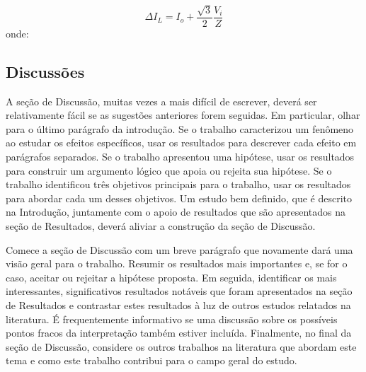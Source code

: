 \begin{equation}\label{eq:eq01}
\Delta I_{L}=I_{o}+\frac{\sqrt{3}}{2}\frac{V_{i}}{Z}
\end{equation} 
onde: 



\subsection{Discussões}
A seção de Discussão, muitas vezes a mais difícil de escrever, deverá ser relativamente fácil se as sugestões anteriores forem seguidas. Em particular, olhar para o último parágrafo da introdução. Se o trabalho caracterizou um fenômeno ao estudar os efeitos específicos, usar os resultados para descrever cada efeito em parágrafos separados. Se o trabalho apresentou uma hipótese, usar os resultados para construir um argumento lógico que apoia ou rejeita sua hipótese. Se o trabalho identificou três objetivos principais para o trabalho, usar os resultados para abordar cada um desses objetivos. Um estudo bem definido, que é descrito na Introdução, juntamente com o apoio de resultados que são apresentados na seção de Resultados, deverá aliviar a construção da seção de Discussão.

Comece a seção de Discussão com um breve parágrafo que novamente dará uma visão geral para o trabalho. Resumir os resultados mais importantes e, se for o caso, aceitar ou rejeitar a hipótese proposta. Em seguida, identificar os mais interessantes, significativos resultados notáveis que foram apresentados
na seção de Resultados e contrastar estes resultados à luz de outros estudos relatados na literatura. É frequentemente informativo se uma discussão sobre os possíveis pontos fracos da interpretação também estiver incluída. Finalmente, no final da seção de Discussão, considere os outros trabalhos na literatura que abordam este tema e como este trabalho contribui para o campo geral do estudo.




\balance


